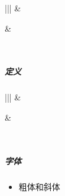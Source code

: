 \documentclass[a4paper,10pt,english]{sphinxmanual}
\begin{document}
\begin{savenotes}\sphinxattablestart
\centering
\begin{tabular}[t]{|||}
\hline
{}\relax &\relax \\
\hline\begin{sphinxfigure-in-table}
\centering

\noindent{}
\end{sphinxfigure-in-table}\relax
&\begin{sphinxfigure-in-table}
\centering

\noindent{}
\end{sphinxfigure-in-table}\relax
\\
\hline
\end{tabular}
\par
\sphinxattableend\end{savenotes}


\subparagraph{定义}
\label{\detokenize{sphinx/1-generate/4-edit:id9}}

\begin{savenotes}\sphinxattablestart
\centering
\begin{tabular}[t]{|||}
\hline
{}\relax &\relax \\
\hline\begin{sphinxfigure-in-table}
\centering

\noindent{}
\end{sphinxfigure-in-table}\relax
&\begin{sphinxfigure-in-table}
\centering

\noindent{}
\end{sphinxfigure-in-table}\relax
\\
\hline
\end{tabular}
\par
\sphinxattableend\end{savenotes}


\subparagraph{字体}
\label{\detokenize{sphinx/1-generate/4-edit:id10}}\begin{itemize}
\item {} 
粗体和斜体

\end{itemize}
\end{document}
